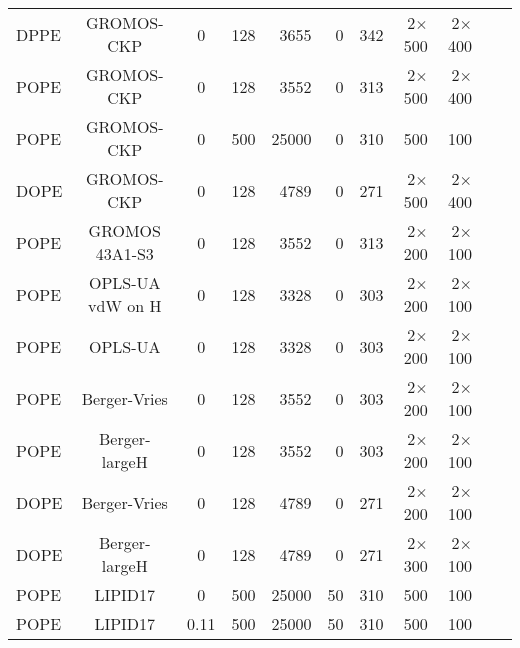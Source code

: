 \documentclass[aps,prl,superscriptaddress,twocolumn]{revtex4}
\begin{document}
\begin{table*}[htb]
\begin{minipage}[t]{\textwidth}
\begin{tabular}{l c c r r r r r r c c}
      \hline
      DPPE  & GROMOS-CKP    \cite{??}      &0    & 128	& 3655  &0    & 342  & 2$\times$500 & 2$\times$400 & \cite{gromosCKPdppe} \\
      POPE  & GROMOS-CKP    \cite{??}      &0    & 128	& 3552  &0    & 313  & 2$\times$500 & 2$\times$400 & \cite{gromosCKPpope} \\
      POPE  & GROMOS-CKP    \cite{??}      &0    & 500	& 25000 &0    & 310  & 500 & 100 & \cite{gromosCKPpopeT310} \\
      DOPE  & GROMOS-CKP    \cite{??}      &0    & 128	& 4789  &0    & 271  & 2$\times$500 & 2$\times$400 & \cite{gromosCKPdope} \\
      \hline
      POPE  & GROMOS 43A1-S3 \cite{??}     &0    & 128	& 3552     &0    & 313  & 2$\times$200 & 2$\times$100 & \cite{gromos43a1s3POPEfiles}  \\
      \hline
      POPE  & OPLS-UA vdW on H \cite{??}   &0    & 128	& 3328     &0    & 303  & 2$\times$200 & 2$\times$100 & \cite{OPLSuaWvdWPOPEfiles} \\
      POPE  & OPLS-UA \cite{??}            &0    & 128	& 3328     &0    & 303  & 2$\times$200 & 2$\times$100 & \cite{OPLSuaPOPEfiles} \\
      \hline
      POPE  & Berger-Vries \cite{??}       &0    & 128	& 3552  &0    & 303  & 2$\times$200 & 2$\times$100 & \cite{bergerPOPEfiles}  \\
      POPE  & Berger-largeH \cite{??}      &0    & 128	& 3552  &0    & 303  & 2$\times$200 & 2$\times$100 & \cite{berger2POPEfiles}  \\
      DOPE  & Berger-Vries \cite{??}       &0    & 128	& 4789  &0    & 271  & 2$\times$200 & 2$\times$100 & \cite{bergerDOPEfiles}  \\
      DOPE  & Berger-largeH \cite{??}      &0    & 128	& 4789  &0    & 271  & 2$\times$300 & 2$\times$100 & \cite{berger2DOPEfiles} \\ 
      \hline
      POPE             & LIPID17 \cite{??} & 0      & 500 & 25000 & 50  &  310  & 500 & 100 & \cite{POPElipid17} \\
      POPE             & LIPID17 \cite{??} & 0.11   & 500 & 25000 & 50  &  310  & 500 & 100 & \cite{POPElipid17150mMNaCl} \\
    \end{tabular}
  \end{minipage}
\end{table*}
\end{document}
